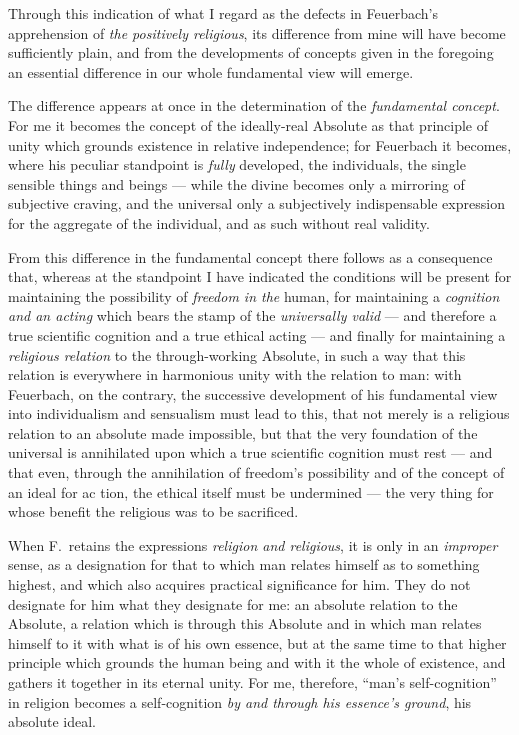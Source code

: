 \documentclass[12pt,a4paper]{book}
\begin{document}
Through this indication of what I regard as the defects in Feuerbach's
apprehension of \emph{the positively religious}, its difference from mine will
have become sufficiently plain, and from the developments of concepts given in
the foregoing an essential difference in our whole fundamental view will
emerge.

The difference appears at once in the determination of the \emph{fundamental
concept}. For me it becomes the concept of the ideally-real Absolute as that
principle of unity which grounds existence in relative independence; for
Feuerbach it becomes, where his peculiar standpoint is \emph{fully} developed,
the individuals, the single sensible things and beings --- while the divine
becomes only a mirroring of subjective craving, and the universal only a
subjectively indispensable expression for the aggregate of the individual, and
as such without real validity.

From this difference in the fundamental concept there follows as a consequence
that, whereas at the standpoint I have indicated the conditions will be
present for maintaining the possibility of \emph{freedom in the} human, for
maintaining a \emph{cognition and an acting} which bears the stamp of the
\emph{universally valid} --- and therefore a true scientific cognition and a
true ethical acting --- and finally for maintaining a \emph{religious
relation} to the through-working Absolute, in such a way that this relation is
everywhere in harmonious unity with the relation to man: with Feuerbach, on
the contrary, the successive development of his fundamental view into
individualism and sensualism must lead to this, that not merely is a religious
relation to an absolute made impossible, but that the very foundation of the
universal is annihilated upon which a true scientific cognition must rest ---
and that even, through the annihilation of freedom's possibility and of the
concept of an ideal for ac\-%
tion, the ethical itself must be undermined --- the very thing for whose
benefit the religious was to be sacrificed.

When F.\ retains the expressions \emph{religion and religious}, it is only in
an \emph{improper} sense, as a designation for that to which man relates
himself as to something highest, and which also acquires practical
significance for him. They do not designate for him what they designate for
me: an absolute relation to the Absolute, a relation which is through this
Absolute and in which man relates himself to it with what is of his own
essence, but at the same time to that higher principle which grounds the human
being and with it the whole of existence, and gathers it together in its
eternal unity. For me, therefore, ``man's self-cognition'' in religion becomes
a self-cognition \emph{by and through his essence's ground}, his absolute
ideal.
\end{document}
